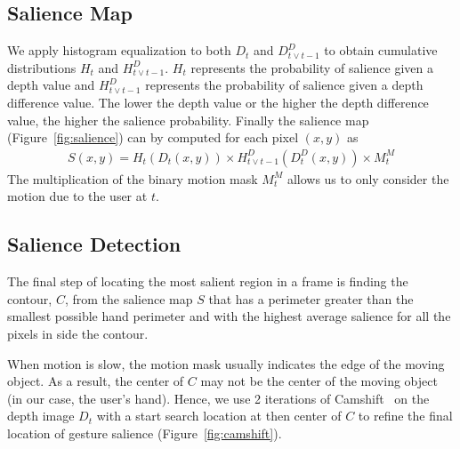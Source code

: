 \documentclass{sigchi}
\begin{document}
\subsection{Salience Map}
We apply histogram equalization to both $D_t$ and $D_{t\vee t-1}^{D}$ to obtain cumulative distributions $H_t$ and $H_{t\vee t-1}^D$.
$H_t$ represents the probability of salience given a depth value and $H_{t\vee t-1}^D$ represents the probability of salience given
a depth difference value. The lower the depth value or the higher the depth difference value, the higher the salience probability.
Finally the salience map (Figure~\ref{fig:salience}) can by computed for each pixel $(x, y)$ as
\begin{align}
S(x, y) = H_t(D_t(x, y)) \times H_{t\vee t-1}^D(D_t^D(x, y)) \times M_t^M
\end{align}
The multiplication of the binary motion mask $M_t^M$ allows us to only consider the motion due to the user at $t$.
 
\subsection{Salience Detection}
The final step of locating the most salient region in a frame is finding the contour, $C$, from the salience map $S$ that has a perimeter greater than the smallest possible
hand perimeter and with the highest average salience for all the pixels in side the contour.

When motion is slow, the motion mask usually indicates the edge of the moving object. As a result, the center of $C$
may not be the center of the moving object (in our case, the user's hand). Hence, we use 2 iterations of Camshift~\cite{Bradski98} on the 
depth image $D_t$ with a start search location at then center of $C$ to refine the final location of gesture salience (Figure~\ref{fig:camshift}).
\end{document}
